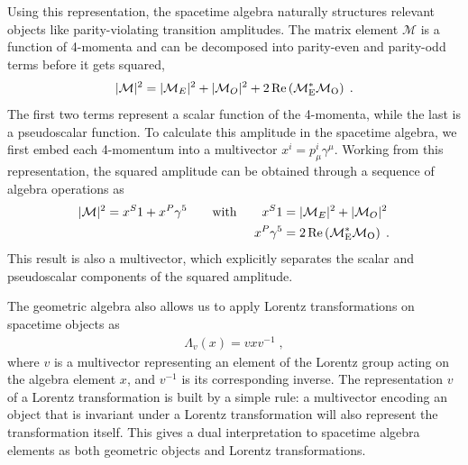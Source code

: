 \documentclass[submission, Phys]{SciPost}
\begin{document}
Using this representation, the spacetime algebra naturally structures relevant objects like parity-violating transition amplitudes. The matrix element $\mathcal{M}$ is a function of 4-momenta and can be decomposed into parity-even and parity-odd terms before it gets squared,
%
\begin{align}
    |\mathcal{M}|^2 = |\mathcal{M}_E|^2 + |\mathcal{M}_O|^2 + 2\, \rm{Re}\left(\mathcal{M}_E^* \mathcal{M}_O \right) \; .
\end{align}
%
The first two terms represent a scalar function of the 4-momenta, while the last is a pseudoscalar function. To calculate this amplitude in the spacetime algebra, we first embed each 4-momentum into a multivector $x^i = p_\mu^i \gamma^\mu$. Working from this representation, the squared amplitude can be obtained through a sequence of algebra operations as
%
\begin{align}
    |\mathcal{M}|^2 = x^S1 + x^P \gamma^5 
    \qquad \text{with} \qquad 
    x^S1 &= |\mathcal{M}_E|^2 + |\mathcal{M}_O|^2 \notag \\
    x^P \gamma^5 &= 2\, \rm{Re}\left(\mathcal{M}_E^* \mathcal{M}_O \right) \; . 
\end{align}
%
This result is also a multivector, which explicitly separates the scalar and pseudoscalar components of the squared amplitude.

The geometric algebra also allows us to apply Lorentz transformations on spacetime objects as 
%
\begin{align}
    \Lambda_v(x) = vxv^{-1} \; , 
    \label{eq:lorentz_law}
\end{align}
%
where $v$ is a multivector representing an element of the Lorentz group acting on the algebra element $x$, and $v^{-1}$ is its corresponding inverse. The representation $v$ of a Lorentz transformation is built by a simple rule: a multivector encoding an object that is invariant under a Lorentz transformation will also represent the transformation itself. This gives a dual interpretation to spacetime algebra elements as both geometric objects and Lorentz transformations.
\end{document}
